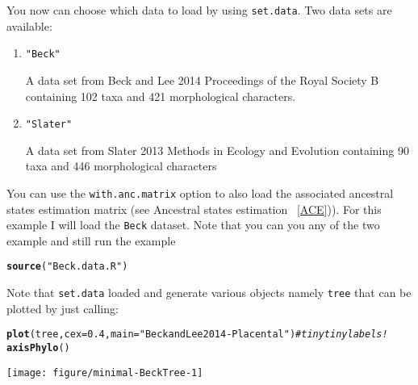 \documentclass[a4paper,11pt]{article}\usepackage[]{graphicx}\usepackage[]{color}
\makeatletter
\def\maxwidth{ %
  \ifdim\Gin@nat@width>\linewidth
    \linewidth
  \else
    \Gin@nat@width
  \fi
}
\newcommand{\hlnum}[1]{\textcolor[rgb]{0.686,0.059,0.569}{#1}}%
\newcommand{\hlstr}[1]{\textcolor[rgb]{0.192,0.494,0.8}{#1}}%
\newcommand{\hlcom}[1]{\textcolor[rgb]{0.678,0.584,0.686}{\textit{#1}}}%
\newcommand{\hlstd}[1]{\textcolor[rgb]{0.345,0.345,0.345}{#1}}%
\newcommand{\hlkwc}[1]{\textcolor[rgb]{0.333,0.667,0.333}{#1}}%
\newcommand{\hlkwd}[1]{\textcolor[rgb]{0.737,0.353,0.396}{\textbf{#1}}}%
\newenvironment{kframe}{%
 \def\at@end@of@kframe{}%
 \ifinner\ifhmode%
  \def\at@end@of@kframe{\end{minipage}}%
  \begin{minipage}{\columnwidth}%
 \fi\fi%
 \def\FrameCommand##1{\hskip\@totalleftmargin \hskip-\fboxsep
 \colorbox{shadecolor}{##1}\hskip-\fboxsep
     \hskip-\linewidth \hskip-\@totalleftmargin \hskip\columnwidth}%
 \MakeFramed {\advance\hsize-\width
   \@totalleftmargin\z@ \linewidth\hsize
   \@setminipage}}%
 {\par\unskip\endMakeFramed%
 \at@end@of@kframe}
\newenvironment{knitrout}{}{} %
\makeatother
\begin{document}
You now can choose which data to load by using \texttt{set.data}. Two data sets are available:
\begin{enumerate}
\item{\texttt{"Beck"}}

A data set from Beck and Lee 2014 Proceedings of the Royal Society B containing 102 taxa and 421 morphological characters.

\item{\texttt{"Slater"}}

A data set from Slater 2013 Methods in Ecology and Evolution containing 90 taxa and 446 morphological characters
\end{enumerate}
You can use the \texttt{with.anc.matrix} option to also load the associated ancestral states estimation matrix (see Ancestral states estimation ~\ref{ACE})).
For this example I will load the \texttt{Beck} dataset. Note that you can you any of the two example and still run the example

\begin{knitrout}
\color{fgcolor}\begin{kframe}
\begin{alltt}
\hlkwd{source}\hlstd{(}\hlstr{"Beck.data.R"}\hlstd{)}
\end{alltt}
\end{kframe}
\end{knitrout}

Note that \texttt{set.data} loaded and generate various objects namely \texttt{tree} that can be plotted by just calling:

\begin{knitrout}
\color{fgcolor}\begin{kframe}
\begin{alltt}
\hlkwd{plot}\hlstd{(tree,} \hlkwc{cex}\hlstd{=}\hlnum{0.4}\hlstd{,} \hlkwc{main}\hlstd{=}\hlstr{"Beck and Lee 2014 - Placental"}\hlstd{)}\hlcom{#tiny tiny labels!}
\hlkwd{axisPhylo}\hlstd{()}
\end{alltt}
\end{kframe}

{\centering \texttt{[image: figure/minimal-BeckTree-1]} 

}



\end{knitrout}
\end{document}
